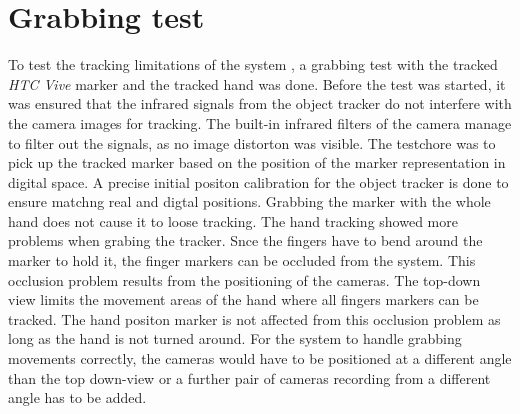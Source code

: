 \section{Grabbing test}
To test the tracking limitations of the system , a grabbing test with the tracked \textit{HTC Vive} marker and the tracked hand was done.
Before the test was started, it was ensured that the infrared signals from the object tracker do not interfere with the camera images for tracking. The built-in infrared filters of the camera manage to filter out the signals, as no image distorton was visible. The testchore was to pick up the tracked marker based on the position of the marker representation in digital space.
A precise initial positon calibration for the object tracker is done to ensure matchng real and digtal positions. Grabbing the marker with the whole hand does not cause it to loose tracking. The hand tracking showed more problems when grabing the tracker. Snce the fingers have to bend around the marker to hold it, the finger markers can be occluded from the system. This occlusion problem results from the positioning of the cameras. The top-down view limits the movement areas of the hand where all fingers markers can be tracked. The hand positon marker is not affected from this occlusion problem as long as the hand is not turned around.
For the system to handle grabbing movements correctly, the cameras would have to be positioned at a different angle than the top down-view or a further pair of cameras recording from a different angle has to be added.
